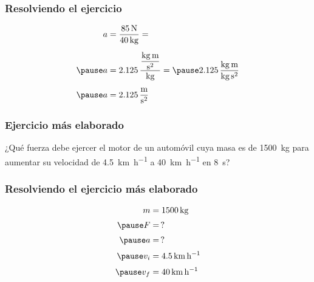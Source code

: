 \documentclass[14pt]{beamer}
\begin{document}
\begin{frame}
\frametitle{Resolviendo el ejercicio}
\pause
\begin{eqnarray*}
\begin{aligned}
a &= \dfrac{\SI{85}{\newton}}{\SI{40}{\kilo\gram}} = \\[0.5em] \pause
a &= 2.125 \, \dfrac{\dfrac{\unit{\kilo\gram\meter}}{\unit{\square\second}}}{\unit{\kilo\gram}} = \pause 2.125 \, \dfrac{\unit{\kilo\gram\meter}}{\unit{\kilo\gram\square\second}} \\[0.5em] \pause
a &= \SI[per-mode=fraction]{2.125}{\meter\per\square\second}
\end{aligned}
\end{eqnarray*}
\end{frame}
\begin{frame}
\frametitle{Ejercicio más elaborado}
¿Qué fuerza debe ejercer el motor de un automóvil cuya masa es de \SI{1500}{\kilo\gram} para aumentar su velocidad de \SI{4.5}{\kilo\meter\per\hour} a \SI{40}{\kilo\meter\per\hour} en \SI{8}{\second}?
\end{frame}
\begin{frame}
\frametitle{Resolviendo el ejercicio más elaborado}
\pause
\begin{eqnarray*}
\begin{aligned}
m &= \SI{1500}{\kilo\gram} \\[0.25em] \pause
F &= \, ? \\[0.25em] \pause
a &= \, ? \\[0.25em] \pause
v_{i} &= \SI{4.5}{\kilo\meter\per\hour} \\[0.25em] \pause
v_{f} &= \SI{40}{\kilo\meter\per\hour}
\end{aligned}
\end{eqnarray*}
\end{frame}
\end{document}
